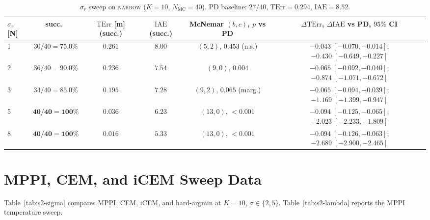 \documentclass[11pt,a4paper]{article}
\newcommand{\Nm}{N_{\mathrm{MC}}}
\newcommand{\TErr}{\mathrm{TErr}}
\newcommand{\IAE}{\mathrm{IAE}}
\begin{document}
\begin{table}[h]
\centering
\caption{$\sigma_r$ sweep on \textsc{narrow} ($K = 10$, $\Nm = 40$). PD baseline: $27/40$, $\TErr = 0.294$, $\IAE = 8.52$.}\label{tab:s1-sigma}
\begin{tabular}{lccccc}
\toprule
$\sigma_r$ [N] & succ.\ & $\TErr$ [m] (succ.) & $\IAE$ (succ.) &
McNemar $(b,c)$, $p$ vs PD & $\Delta\TErr$, $\Delta\IAE$ vs PD, $95\%$ CI \\
\midrule
1 & $30/40 = 75.0\%$ & $0.261$ & $8.00$ & $(5,2)$, $0.453$ (n.s.) &
$-0.043\;[-0.070,-0.014]$;\;$-0.430\;[-0.649,-0.227]$ \\
2 & $36/40 = 90.0\%$ & $0.236$ & $7.54$ & $(9,0)$, $\mathbf{0.004}$ &
$-0.065\;[-0.092,-0.040]$;\;$-0.874\;[-1.071,-0.672]$ \\
3 & $34/40 = 85.0\%$ & $0.195$ & $7.28$ & $(9,2)$, $0.065$ (marg.) &
$-0.065\;[-0.094,-0.039]$;\;$-1.169\;[-1.399,-0.947]$ \\
5 & $\mathbf{40/40 = 100\%}$ & $\mathbf{0.036}$ & $\mathbf{6.23}$ &
$(13,0)$, $\mathbf{<0.001}$ &
$\mathbf{-0.094\;[-0.125,-0.065]}$;\;$\mathbf{-2.023\;[-2.233,-1.809]}$ \\
8 & $\mathbf{40/40 = 100\%}$ & $\mathbf{0.016}$ & $\mathbf{5.33}$ &
$(13,0)$, $\mathbf{<0.001}$ &
$\mathbf{-0.094\;[-0.126,-0.063]}$;\;$\mathbf{-2.689\;[-2.900,-2.465]}$ \\
\bottomrule
\end{tabular}
\end{table}

\section{MPPI, CEM, and iCEM Sweep Data}
\label{sec:S2}

Table~\ref{tab:s2-sigma} compares MPPI, CEM, iCEM, and hard-argmin at
$K = 10$, $\sigma \in \{2, 5\}$. Table~\ref{tab:s2-lambda} reports
the MPPI temperature sweep.
\end{document}
